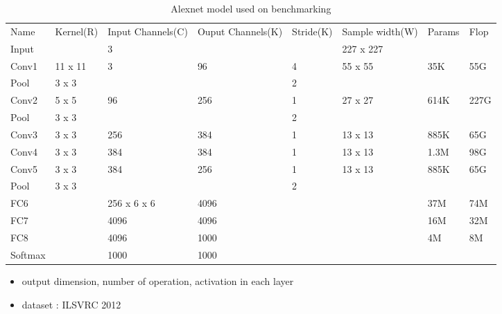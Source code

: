 \documentclass[conference]{IEEEtran}
\begin{document}
\begin{table}[]
\centering
\caption{Alexnet model used on benchmarking}
\label{alex_model}
\begin{tabular}{llllllll}
Name    & Kernel(R) & Input Channels(C) & Ouput Channels(K) & Stride(K) & Sample width(W) & Params & Flop \\
Input   &           & 3                 &                   &           & 227 x 227       &        &      \\
Conv1   & 11 x 11   & 3                 & 96                & 4         & 55 x 55         & 35K    & 55G  \\
Pool    & 3 x 3     &                   &                   & 2         &                 &        &      \\
Conv2   & 5 x 5     & 96                & 256               & 1         & 27 x 27         & 614K   & 227G \\
Pool    & 3 x 3     &                   &                   & 2         &                 &        &      \\
Conv3   & 3 x 3     & 256               & 384               & 1         & 13 x 13         & 885K   & 65G  \\
Conv4   & 3 x 3     & 384               & 384               & 1         & 13 x 13         & 1.3M   & 98G  \\
Conv5   & 3 x 3     & 384               & 256               & 1         & 13 x 13         & 885K   & 65G  \\
Pool    & 3 x 3     &                   &                   & 2         &                 &        &      \\
FC6     &           & 256 x 6 x 6       & 4096              &           &                 & 37M    & 74M  \\
FC7     &           & 4096              & 4096              &           &                 & 16M    & 32M  \\
FC8     &           & 4096              & 1000              &           &                 & 4M     & 8M   \\
Softmax &           & 1000              & 1000              &           &                 &        &     
\end{tabular}
\end{table}

\begin{itemize}
  \item output dimension, number of operation, activation in each layer
  \item dataset : ILSVRC 2012
\end{itemize}
\end{document}
